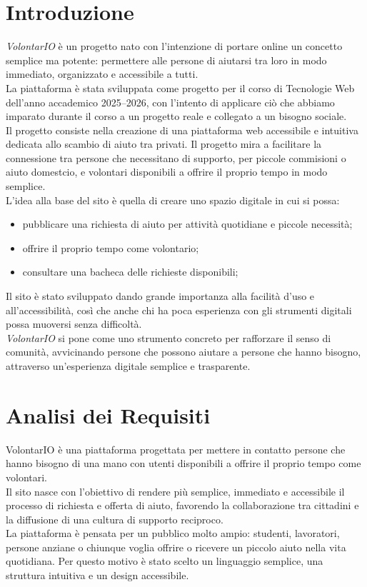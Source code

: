 \documentclass[a4paper,11pt]{article}
\begin{document}
\tableofcontents
\newpage


\section{Introduzione}
\textit{VolontarIO} è un progetto nato con l’intenzione di portare online un concetto semplice ma potente: permettere alle persone di aiutarsi tra loro in modo immediato, organizzato e accessibile a tutti.\\
La piattaforma è stata sviluppata come progetto per il corso di Tecnologie Web dell’anno accademico 2025–2026, con l’intento di applicare ciò che abbiamo imparato durante il corso a un progetto reale e collegato a un bisogno sociale.\\
Il progetto consiste nella creazione di una piattaforma web accessibile e intuitiva dedicata allo scambio di aiuto tra privati. Il progetto mira a facilitare la connessione tra persone che necessitano di supporto, per piccole commisioni o aiuto domestcio, e volontari disponibili a offrire il proprio tempo in modo semplice.\\
L’idea alla base del sito è quella di creare uno spazio digitale in cui si possa:
\begin{itemize}
    \item pubblicare una richiesta di aiuto per attività quotidiane e piccole necessità;
    \item offrire il proprio tempo come volontario;
    \item consultare una bacheca delle richieste disponibili;
\end{itemize}
Il sito è stato sviluppato dando grande importanza alla facilità d’uso e all’accessibilità, così che anche chi ha poca esperienza con gli strumenti digitali possa muoversi senza difficoltà.\\ 
\textit{VolontarIO} si pone come uno strumento concreto per rafforzare il senso di comunità, avvicinando persone che possono aiutare a persone che hanno bisogno, attraverso un'esperienza digitale semplice e trasparente.
\section{Analisi dei Requisiti}
VolontarIO è una piattaforma progettata per mettere in contatto persone che hanno bisogno di una mano con utenti disponibili a offrire il proprio tempo come volontari.\\
Il sito nasce con l’obiettivo di rendere più semplice, immediato e accessibile il processo di richiesta e offerta di aiuto, favorendo la collaborazione tra cittadini e la diffusione di una cultura di supporto reciproco.\\
La piattaforma è pensata per un pubblico molto ampio: studenti, lavoratori, persone anziane o chiunque voglia offrire o ricevere un piccolo aiuto nella vita quotidiana. Per questo motivo è stato scelto un linguaggio semplice, una struttura intuitiva e un design accessibile.
\end{document}
